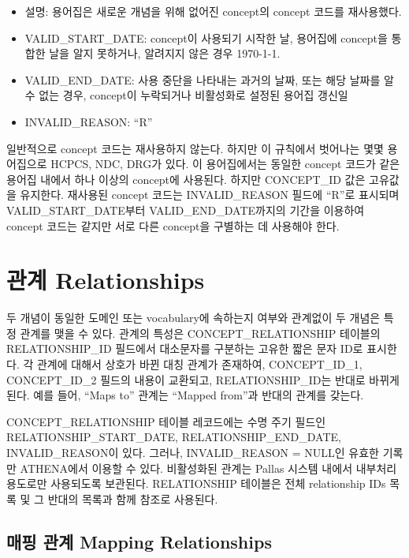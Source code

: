 \documentclass[10.5pt]{book}
\providecommand{\tightlist}{%
  \setlength{\itemsep}{0pt}\setlength{\parskip}{0pt}}
\theoremstyle{definition}
\theoremstyle{definition}
\theoremstyle{definition}
\theoremstyle{remark}
\begin{document}
\begin{itemize}
  \begin{itemize}
  \tightlist
  \item
    설명: 용어집은 새로운 개념을 위해 없어진 concept의 concept 코드를
    재사용했다.
  \item
    VALID\_START\_DATE: concept이 사용되기 시작한 날, 용어집에 concept을
    통합한 날을 알지 못하거나, 알려지지 않은 경우 1970-1-1.
  \item
    VALID\_END\_DATE: 사용 중단을 나타내는 과거의 날짜, 또는 해당 날짜를
    알 수 없는 경우, concept이 누락되거나 비활성화로 설정된 용어집
    갱신일
  \item
    INVALID\_REASON: ``R''
  \end{itemize}
\end{itemize}

일반적으로 concept 코드는 재사용하지 않는다. 하지만 이 규칙에서 벗어나는
몇몇 용어집으로 HCPCS, NDC, DRG가 있다. 이 용어집에서는 동일한 concept
코드가 같은 용어집 내에서 하나 이상의 concept에 사용된다. 하지만
CONCEPT\_ID 값은 고유값을 유지한다. 재사용된 concept 코드는
INVALID\_REASON 필드에 ``R''로 표시되며 VALID\_START\_DATE부터
VALID\_END\_DATE까지의 기간을 이용하여 concept 코드는 같지만 서로 다른
concept을 구별하는 데 사용해야 한다.

\section{관계 Relationships}\label{-relationships}

두 개념이 동일한 도메인 또는 vocabulary에 속하는지 여부와 관계없이 두
개념은 특정 관계를 맺을 수 있다. 관계의 특성은 CONCEPT\_RELATIONSHIP
테이블의 RELATIONSHIP\_ID 필드에서 대소문자를 구분하는 고유한 짧은 문자
ID로 표시한다. 각 관계에 대해서 상호가 바뀐 대칭 관계가 존재하여,
CONCEPT\_ID\_1, CONCEPT\_ID\_2 필드의 내용이 교환되고,
RELATIONSHIP\_ID는 반대로 바뀌게 된다. 예를 들어, ``Maps to'' 관계는
``Mapped from''과 반대의 관계를 갖는다. 

CONCEPT\_RELATIONSHIP 테이블 레코드에는 수명 주기 필드인
RELATIONSHIP\_START\_DATE, RELATIONSHIP\_END\_DATE, INVALID\_REASON이
있다. 그러나, INVALID\_REASON = NULL인 유효한 기록만 ATHENA에서 이용할
수 있다. 비활성화된 관계는 Pallas 시스템 내에서 내부처리 용도로만
사용되도록 보관된다. RELATIONSHIP 테이블은 전체 relationship IDs 목록 및
그 반대의 목록과 함께 참조로 사용된다.

\subsection{매핑 관계 Mapping Relationships}\label{conceptMapping}
\end{document}
